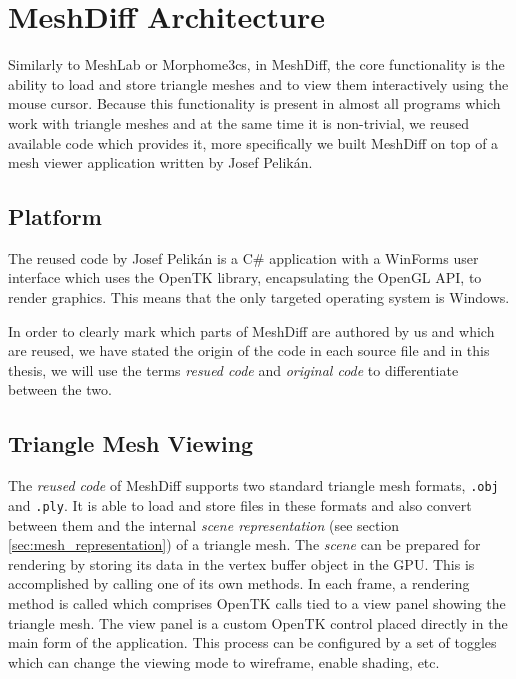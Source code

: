 \section{MeshDiff Architecture}

Similarly to MeshLab or Morphome3cs, in MeshDiff, the core functionality is the ability to load and store triangle meshes and to view them interactively using the mouse cursor. Because this functionality is present in almost all programs which work with triangle meshes and at the same time it is non-trivial, we reused available code which provides it, more specifically we built MeshDiff on top of a mesh viewer application written by Josef Pelikán.

\subsection{Platform}

The reused code by Josef Pelikán is a C\# application with a WinForms user interface which uses the OpenTK library, encapsulating the OpenGL API, to render graphics. This means that the only targeted operating system is Windows.

In order to clearly mark which parts of MeshDiff are authored by us and which are reused, we have stated the origin of the code in each source file and in this thesis, we will use the terms {\it resued code} and {\it original code} to differentiate between the two.

\subsection{Triangle Mesh Viewing}

The {\it reused code} of MeshDiff supports two standard triangle mesh formats, \verb+.obj+ and \verb+.ply+. It is able to load and store files in these formats and also convert between them and the internal {\it scene representation} (see section \ref{sec:mesh_representation}) of a triangle mesh. The {\it scene} can be prepared for rendering by storing its data in the vertex buffer object in the GPU. This is accomplished by calling one of its own methods. In each frame, a rendering method is called which comprises OpenTK calls tied to a view panel showing the triangle mesh. The view panel is a custom OpenTK control placed directly in the main form of the application. This process can be configured by a set of toggles which can change the viewing mode to wireframe, enable shading, etc.

